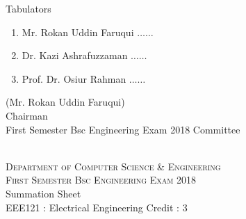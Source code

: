 \documentclass[12pt]{article}
\begin{document}
            \begin{table}[hb]
            	\centering
            \begin{minipage}[b]{0.5\linewidth} %
            {\centering Tabulators }
            \begin{enumerate}
                \item Mr. Rokan Uddin Faruqui \hspace*{1ex} $\ldots \ldots  $  
                \item Dr. Kazi Ashrafuzzaman \hspace*{1ex} $\ldots \ldots  $  
                \item Prof. Dr. Osiur Rahman \hspace*{1ex} $\ldots \ldots $  
            \end{enumerate} 

            \end{minipage}
            \hspace*{1.2cm}
            \begin{minipage}[b]{0.4\linewidth} \centering
            (Mr. Rokan Uddin Faruqui) \\
            Chairman  \hspace*{1ex} \\
           First Semester Bsc Engineering Exam 2018 Committee
            \end{minipage}
            \end{table}
            \clearpage
    \centering
    \begin{minipage}[m]{.8\textwidth} \centering 
	\smallskip
	\\
	\textsc{Department of Computer Science \& Engineering}\\
	\textsc{ First Semester Bsc Engineering Exam 2018}\\
    {\large {\sc Summation Sheet}}\\  
     {\centering EEE121 : Electrical Engineering     Credit : 3 } \\
    \end{minipage} 
\end{document}
